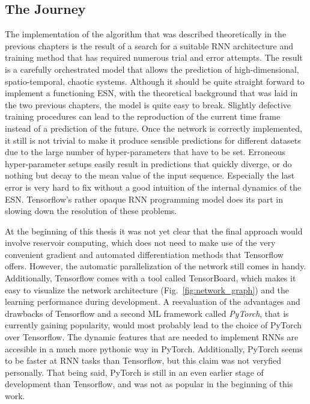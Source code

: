 \subsection{The Journey}%
\label{sub:the_journey}
The implementation of the algorithm that was described theoretically in the
previous chapters is the result of a search for a suitable RNN architecture and
training method that has required numerous trial and error attempts.  The
result is a carefully orchestrated model that allows the prediction of
high-dimensional, spatio-temporal, chaotic systems. Although it should be quite
straight forward to implement a functioning ESN, with the theoretical
background that was laid in the two previous chapters, the model is quite
easy to break. Slightly defective training procedures can lead to the
reproduction of the current time frame instead of a prediction of the future.
Once the network is correctly implemented, it still is not trivial to make it
produce sensible predictions for different datasets due to the large number of
hyper-parameters that have to be set.  Erroneous hyper-parameter setups easily
result in predictions that quickly diverge, or do nothing but decay to the mean
value of the input sequence.  Especially the last error is very hard to fix
without a good intuition of the internal dynamics of the ESN.  Tensorflow's
rather opaque RNN programming model does its part in slowing down the
resolution of these problems.

At the beginning of this thesis it was not yet clear that the final approach
would involve reservoir computing, which does not need to make use of the very
convenient gradient and automated differentiation methods that Tensorflow
offers. However, the automatic parallelization of the network still comes in
handy. Additionally, Tensorflow comes with a tool called TensorBoard, which
makes it easy to visualize the network architecture
(Fig.~\ref{fig:network_graph}) and the learning performance during development.
A reevaluation of the advantages and drawbacks of Tensorflow and a second ML
framework called \emph{PyTorch}, that is currently gaining popularity, would
most probably lead to the choice of PyTorch over Tensorflow.  The dynamic
features that are needed to implement RNNs are accesible in a much more
pythonic way in PyTorch. Additionally, PyTorch seems to be faster at RNN tasks
than Tensorflow, but this claim was not veryfied personally. That being said,
PyTorch is still in an even earlier stage of development than Tensorflow, and
was not as popular in the beginning of this work.


